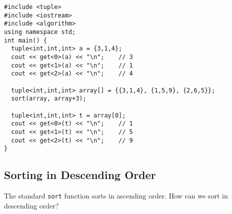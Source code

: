 \begin{c11box}[emph={tuple}]
\begin{verbatim}
#include <tuple>
#include <iostream>
#include <algorithm>
using namespace std;
int main() {
  tuple<int,int,int> a = {3,1,4};
  cout << get<0>(a) << "\n";	// 3
  cout << get<1>(a) << "\n";	// 1
  cout << get<2>(a) << "\n";	// 4

  tuple<int,int,int> array[] = {{3,1,4}, {1,5,9}, {2,6,5}};
  sort(array, array+3);
  
  tuple<int,int,int> t = array[0];
  cout << get<0>(t) << "\n";	// 1
  cout << get<1>(t) << "\n";	// 5
  cout << get<2>(t) << "\n";	// 9
}
\end{verbatim}
\end{c11box}
\subsection{Sorting in Descending Order}
The standard \texttt{sort} function sorts in ascending order. How can we sort in descending order?
